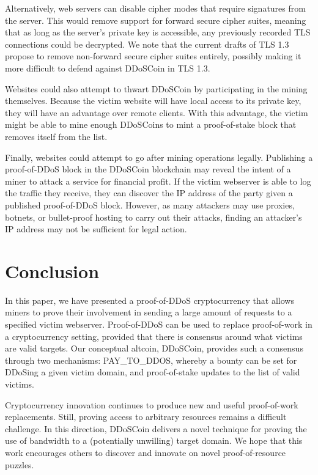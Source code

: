 Alternatively, web servers can disable cipher modes that require signatures from
the server. This would remove support for forward secure cipher suites, meaning
that as long as the server's private key is accessible, any previously recorded
TLS connections could be decrypted. We note that the current drafts of TLS 1.3
propose to remove non-forward secure cipher suites entirely, possibly making it
more difficult to defend against DDoSCoin in TLS 1.3.

Websites could also attempt to thwart DDoSCoin by participating in the mining
themselves. Because the victim website will have local access to its private
key, they will have an advantage over remote clients. With this advantage, the
victim might be able to mine enough DDoSCoins to mint a proof-of-stake block
that removes itself from the list.

Finally, websites could attempt to go after mining operations legally.
Publishing a proof-of-DDoS block in the DDoSCoin blockchain may reveal the
intent of a miner to attack a service for financial profit. If the victim webserver is able to
log the traffic they receive, they can discover the IP address of the party
given a published proof-of-DDoS block. However, as many attackers may use proxies,
botnets, or bullet-proof hosting to carry out their attacks, finding an
attacker's IP address may not be sufficient for legal action.


\section{Conclusion}

In this paper, we have presented a proof-of-DDoS cryptocurrency that allows
miners to prove their involvement in sending a large amount of requests to a
specified victim webserver. Proof-of-DDoS can be used to replace proof-of-work
in a cryptocurrency setting, provided that there is consensus around what
victims are valid targets. Our conceptual altcoin, DDoSCoin, provides such a
consensus through two mechanisms: PAY\_TO\_DDOS, whereby a bounty can be set for
DDoSing a given victim domain, and proof-of-stake updates to the list of valid
victims.

Cryptocurrency innovation continues to produce new and useful proof-of-work
replacements. Still, proving access to arbitrary resources remains a difficult
challenge. In this direction, DDoSCoin delivers a novel technique for proving
the use of bandwidth to a (potentially unwilling) target domain. We hope that
this work encourages others to discover and innovate on novel proof-of-resource
puzzles.

{\footnotesize\balance

}


